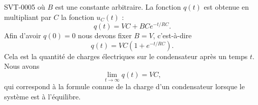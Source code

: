 \begin{corrige}{SVT-0005}
    où \( B\) est une constante arbitraire. La fonction \( q(t)\) est obtenue en multipliant par \( C\) la fonction \( u_C(t)\) :
    \begin{equation}
        q(t)=VC+BC e^{-t/RC}.
    \end{equation}
    Afin d'avoir \( q(0)=0\) nous devons fixer \( B=V\), c'est-à-dire 
    \begin{equation}
        q(t)=VC(1+ e^{-t/RC}).
    \end{equation}
    Cela est la quantité de charges électriques sur le condensateur après un temps \( t\). Nous avons
    \begin{equation}
        \lim_{t\to \infty} q(t)=VC,
    \end{equation}
    qui correspond à la formule connue de la charge d'un condensateur lorsque le système est à l'équilibre.

\end{corrige}
